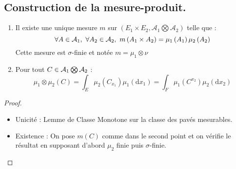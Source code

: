 \documentclass{cours}
\begin{document}
        \subsection{Construction de la mesure-produit.}
        \begin{theorem}
            \begin{enumerate}
                \item Il existe une unique mesure $m$ sur $\left(E_{1} \times E_{2}, \mathcal{A}_{1} \bigotimes \mathcal{A}_{2}\right)$ telle que : 
                \[
                    \forall A \in \mathcal{A}_{1}, \ \forall A_{2} \in \mathcal{A}_{2}, \ m\left(A_{1} \times A_{2}\right) = \mu_{1}\left(A_{1}\right)\mu_{2}\left(A_{2}\right)
                \]
                Cette mesure est $\sigma$-finie et notée $m = \mu_{1} \otimes \nu$
                \item Pour tout $C \in \mathcal{A}_{1}\bigotimes\mathcal{A}_{2}$ :
                \[
                    \mu_{1} \otimes \mu_{2}\left(C\right) = \int_{E}\mu_{2}\left(C_{x_{1}}\right) \mu_{1}(\mathrm{d}x_{1}) = \int_{F} \mu_{1}\left(C^{x_{2}}\right)\mu_{2}\left(\mathrm{d}x_{2}\right)
                \]
            \end{enumerate}
        \end{theorem}
        \begin{proof}
            \begin{itemize}
                \item Unicité : Lemme de Classe Monotone sur la classe des pavés mesurables.
                \item Existence : On pose $m\left(C\right)$ comme dans le second point et on vérifie le résultat en supposant d'abord $\mu_{2}$ finie puis $\sigma$-finie.
            \end{itemize}
        \end{proof}
\end{document}
